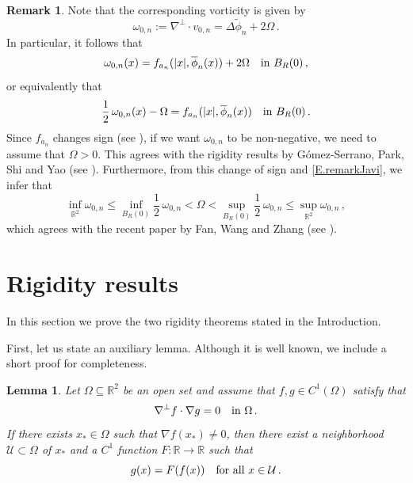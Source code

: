 \documentclass[11pt,oneside]{amsart}
\newtheorem{lemma}[theorem]{Lemma}
\theoremstyle{definition}
\newtheorem{remark}[theorem]{Remark}
\newcommand{\Om}{\Omega}
\def\RR{\mathbb{R}}
\renewcommand\leq\leqslant
\numberwithin{equation}{section}
\begin{document}
\begin{remark}
Note that the corresponding vorticity is given by
$$
\omega_{0,n} := \nabla^{\perp} \cdot v_{0,n} = \Delta \widetilde{\phi}_n + 2 \Omega\,.
$$
In particular, it follows that
$$
\omega_{0,n}(x) = f_{a_n}(|x|, \overline{\phi}_n(x)) + 2\Om \quad \textup{in } B_R(0)\,,
$$
or equivalently that
\begin{equation} \label{E.remarkJavi}
\frac12\,\omega_{0,n}(x) - \Omega = f_{a_n}(|x|,\overline{\phi}_n(x)) \quad \textup{in } B_R(0)\,.
\end{equation}
Since $f_{a_n}$ changes sign (see \cite[Lemma 3.1 and Figure 1]{EFR}), if we want $\omega_{0,n}$ to be non-negative, we need to assume that $\Omega > 0$. This agrees with the rigidity results by G\'omez-Serrano, Park, Shi and Yao (see \cite[Theorem B]{GPSY}). Furthermore, from this change of sign and \eqref{E.remarkJavi}, we infer that
$$
\inf_{\RR^2} \omega_{0,n} \leq \inf_{B_R(0)} \frac12\,\omega_{0,n} < \Om < \sup_{B_R(0)} \frac12\,\omega_{0,n} \leq \sup_{\RR^2} \omega_{0,n} \,,
$$
which agrees with the recent paper by Fan, Wang and Zhang (see \cite[Theorem 1.4]{FanWangZhan25}). 
\end{remark}


\section{Rigidity results}

In this section we prove the two rigidity theorems stated in the Introduction. 


First, let us state an auxiliary lemma. Although it is well known, we include a short proof for completeness.


\begin{lemma} \label{L.semilinear}
    Let $\Om \subseteq \RR^2$ be an open set and assume that $f,g \in C^1(\Omega)$ satisfy that
    $$
    \nabla^{\perp} f \cdot \nabla g = 0 \quad \textup{in } \Omega\,.
    $$
    If there exists $x_* \in \Omega$ such that $\nabla f (x_*) \neq 0$, then there exist a neighborhood $\mathcal U \subset \Omega$ of $x_*$ and a $C^1$ function $F: \RR \to \RR$ such that
    \begin{equation} \label{E.conclussionL.semilinear}
    g(x) = F(f(x)) \quad \textup{for all } x \in \mathcal{U}\,.
    \end{equation}
\end{lemma}
\end{document}
